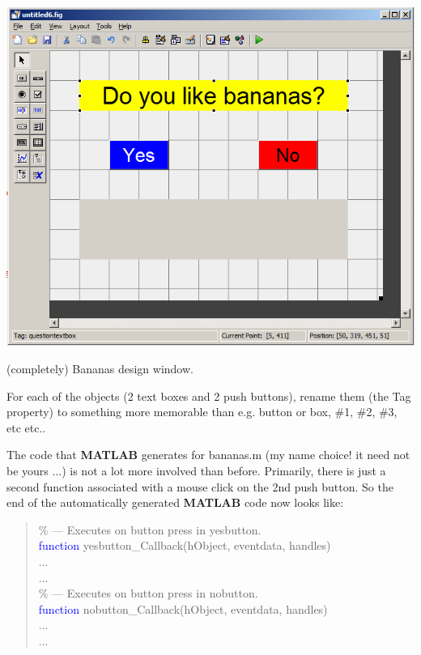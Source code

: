 \documentclass{tufte-book} %
\newenvironment{docspec}{\begin{quotation}\ttfamily\parskip0pt\parindent0pt\ignorespaces}{\end{quotation}}
\begin{document}
\begin{marginfigure}[0.0in]
\includegraphics[width=\linewidth]{chGUI-bananas.png}
\caption{(completely) Bananas design window.}
\label{fig:chGUI-bananas}
\end{marginfigure}

For each of the objects (2 text boxes and 2 push buttons),  rename them (the \textsf{Tag} property) to something more memorable than e.g. button or box, \#1, \#2, \#3, etc etc..

The code that \textbf{MATLAB} generates for \textsf{bananas.m} (my name choice! it need not be yours ...) is not a lot more involved than before. Primarily, there is just a second function associated with a mouse click on the 2nd push button. So the end of the automatically generated \textbf{MATLAB} code now looks like:

\begin{docspec}
\textcolor[rgb]{0,0.501961,0}{\% --- Executes on button press in yesbutton.}
\\\textcolor{blue}{function} yesbutton\_Callback(hObject, eventdata, handles)
\\...
\\...
\\\textcolor[rgb]{0,0.501961,0}{\% --- Executes on button press in nobutton.}
\\\textcolor{blue}{function} nobutton\_Callback(hObject, eventdata, handles)
\\...
\\...
\end{docspec}
\end{document}
